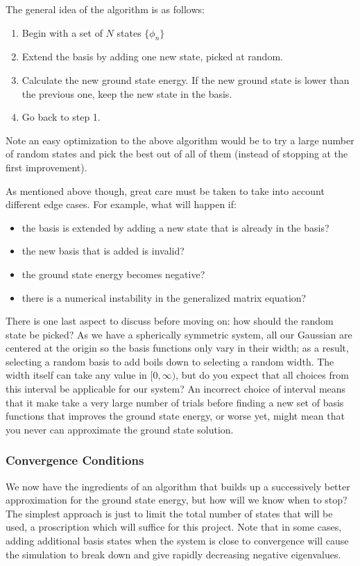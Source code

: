 \documentclass[
  a4paper,             %
  11pt,                %
  oneside,             %
  onecolumn,           %
  bibliography=totoc,  %
  final,               %
]{scrartcl}
\begin{document}
The general idea of the algorithm is as follows:
\begin{enumerate}
\item Begin with a set of \(N\) states \(\{\phi_{n}\}\)
\item Extend the basis by adding one new state, picked at random.
\item Calculate the new ground state energy.  If the new ground state is lower
  than the previous one, keep the new state in the basis.
\item Go back to step 1.
\end{enumerate}
Note an easy optimization to the above algorithm would be to try a large number
of random states and pick the best out of all of them (instead of stopping at
the first improvement).

As mentioned above though, great care must be taken to take into account
different edge cases.  For example, what will happen if:
\begin{itemize}
\item the basis is extended by adding a new state that is already in the basis?
\item the new basis that is added is invalid?
\item the ground state energy becomes negative?
\item there is a numerical instability in the generalized matrix equation?
\end{itemize}

There is one last aspect to discuss before moving on: how should the random
state be picked?  As we have a spherically symmetric system, all our Gaussian
are centered at the origin so the basis functions only vary in their width; as a
result, selecting a random basis to add boils down to selecting a random width.
The width itself can take any value in \([0, \infty)\), but do you expect that
all choices from this interval be applicable for our system?  An incorrect
choice of interval means that it make take a very large number of trials before
finding a new set of basis functions that improves the ground state energy, or
worse yet, might mean that you never can approximate the ground state solution.

\subsubsection{Convergence Conditions}
\label{subsubsec:convergence_conditions}

We now have the ingredients of an algorithm that builds up a successively better
approximation for the ground state energy, but how will we know when to stop?
The simplest approach is just to limit the total number of states that will be
used, a proscription which will suffice for this project.  Note that in some
cases, adding additional basis states when the system is close to convergence
will cause the simulation to break down and give rapidly decreasing negative
eigenvalues.
\end{document}
